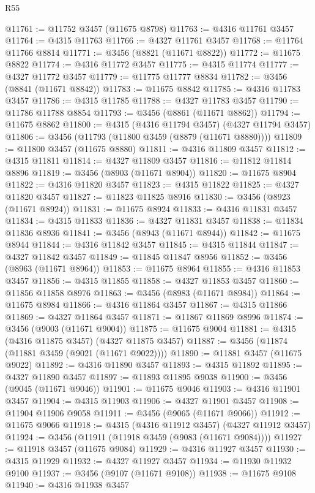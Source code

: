 \begin{lexlean}{R55}
\begin{coremodule}
@11761 := @11752 @3457 (@11675 @8798)
@11763 := @4316 @11761 @3457
@11764 := @4315 @11763
@11766 := @4327 @11761 @3457
@11768 := @11764 @11766 @8814
@11771 := @3456 (@8821 (@11671 @8822))
@11772 := @11675 @8822
@11774 := @4316 @11772 @3457
@11775 := @4315 @11774
@11777 := @4327 @11772 @3457
@11779 := @11775 @11777 @8834
@11782 := @3456 (@8841 (@11671 @8842))
@11783 := @11675 @8842
@11785 := @4316 @11783 @3457
@11786 := @4315 @11785
@11788 := @4327 @11783 @3457
@11790 := @11786 @11788 @8854
@11793 := @3456 (@8861 (@11671 @8862))
@11794 := @11675 @8862
@11800 := @4315 (@4316 @11794 @3457) (@4327 @11794 @3457)
@11806 := @3456 (@11793 (@11800 @3459 (@8879 (@11671 @8880))))
@11809 := @11800 @3457 (@11675 @8880)
@11811 := @4316 @11809 @3457
@11812 := @4315 @11811
@11814 := @4327 @11809 @3457
@11816 := @11812 @11814 @8896
@11819 := @3456 (@8903 (@11671 @8904))
@11820 := @11675 @8904
@11822 := @4316 @11820 @3457
@11823 := @4315 @11822
@11825 := @4327 @11820 @3457
@11827 := @11823 @11825 @8916
@11830 := @3456 (@8923 (@11671 @8924))
@11831 := @11675 @8924
@11833 := @4316 @11831 @3457
@11834 := @4315 @11833
@11836 := @4327 @11831 @3457
@11838 := @11834 @11836 @8936
@11841 := @3456 (@8943 (@11671 @8944))
@11842 := @11675 @8944
@11844 := @4316 @11842 @3457
@11845 := @4315 @11844
@11847 := @4327 @11842 @3457
@11849 := @11845 @11847 @8956
@11852 := @3456 (@8963 (@11671 @8964))
@11853 := @11675 @8964
@11855 := @4316 @11853 @3457
@11856 := @4315 @11855
@11858 := @4327 @11853 @3457
@11860 := @11856 @11858 @8976
@11863 := @3456 (@8983 (@11671 @8984))
@11864 := @11675 @8984
@11866 := @4316 @11864 @3457
@11867 := @4315 @11866
@11869 := @4327 @11864 @3457
@11871 := @11867 @11869 @8996
@11874 := @3456 (@9003 (@11671 @9004))
@11875 := @11675 @9004
@11881 := @4315 (@4316 @11875 @3457) (@4327 @11875 @3457)
@11887 := @3456 (@11874 (@11881 @3459 (@9021 (@11671 @9022))))
@11890 := @11881 @3457 (@11675 @9022)
@11892 := @4316 @11890 @3457
@11893 := @4315 @11892
@11895 := @4327 @11890 @3457
@11897 := @11893 @11895 @9038
@11900 := @3456 (@9045 (@11671 @9046))
@11901 := @11675 @9046
@11903 := @4316 @11901 @3457
@11904 := @4315 @11903
@11906 := @4327 @11901 @3457
@11908 := @11904 @11906 @9058
@11911 := @3456 (@9065 (@11671 @9066))
@11912 := @11675 @9066
@11918 := @4315 (@4316 @11912 @3457) (@4327 @11912 @3457)
@11924 := @3456 (@11911 (@11918 @3459 (@9083 (@11671 @9084))))
@11927 := @11918 @3457 (@11675 @9084)
@11929 := @4316 @11927 @3457
@11930 := @4315 @11929
@11932 := @4327 @11927 @3457
@11934 := @11930 @11932 @9100
@11937 := @3456 (@9107 (@11671 @9108))
@11938 := @11675 @9108
@11940 := @4316 @11938 @3457

\end{coremodule}
\end{lexlean}
